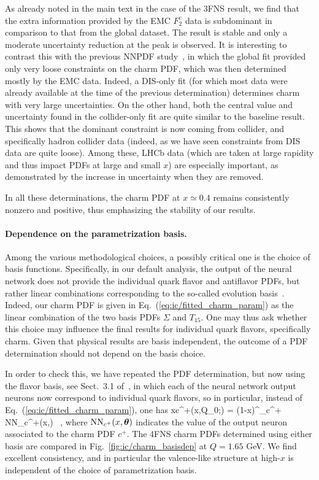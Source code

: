 As already noted in the main  text in the case of the 3FNS
result, we find that the extra information provided by the  EMC
$F_2^c$ data is subdominant in comparison to that from the global
dataset. The result is stable and only a moderate
uncertainty reduction at the peak is observed. It is interesting to
contrast this with the previous NNPDF study~\cite{Ball:2016neh}, in
which the global fit provided only very loose constraints on the charm
PDF, which was then determined mostly by the EMC data.
%
Indeed, a DIS-only fit (for which most data were already available at the time
of the previous determination) determines charm with very large
uncertainties. On the other hand, both the central value and
uncertainty found in the collider-only fit are quite similar to the
baseline result.
%
This shows that the dominant constraint is now coming from
collider, and specifically hadron collider data (indeed, as we have
seen constraints from DIS data are quite loose). Among these, LHCb
data (which are taken at large rapidity and thus impact PDFs at large
and small $x$) are especially important, as demonstrated by the
increase in uncertainty when they are removed.

In all these determinations, the charm
PDF at $x\simeq 0.4$ remains consistently nonzero and positive, thus
emphasizing the stability of our results.

\paragraph{Dependence on the parametrization basis.}
%
Among the various methodological choices, a possibly critical one is
the choice of basis functions. Specifically, in our default analysis,
the output of the neural network does not provide the individual
quark flavor and antiflavor PDFs, but rather linear combinations
corresponding to the so-called evolution
basis~\cite{Ball:2021leu}. Indeed, our charm PDF is given in
Eq.~(\ref{eq:ic/fitted_charm_param})  as the linear combination of the
two basis PDFs $\Sigma$ and $T_{15}$.
One may thus ask whether this choice may influence the final results
for individual quark flavors, specifically charm.
Given that physical results are basis
independent, the outcome of a PDF determination should not depend
on the basis choice.

In order to check this, we have repeated the PDF determination, but
now using the flavor basis, see Sect.~3.1 of~\cite{Ball:2021leu}, in which
each of the  neural network output neurons now correspond to individual quark
flavors, so in particular,
instead of Eq.~(\ref{eq:ic/fitted_charm_param}),  one has
\be
\label{eq:ic/fitted_charm_param_flavour}
xc^+(x,Q_0;{\boldsymbol \theta}) =
 (1-x)^{\beta_{c^+}} {\rm NN}_{c^+}(x,{\boldsymbol \theta}) \, ,
\ee
where ${\rm NN}_{c^+}(x,{\boldsymbol \theta})$
indicates the value of the output neuron associated to the charm PDF $c^+$.
%
The 4FNS charm PDFs determined using either basis are compared 
in Fig.~\ref{fig:ic/charm_basisdep}  at $Q=1.65$ GeV.
%
We find excellent consistency, and in particular 
the valence-like structure at high-$x$ is independent of the choice
of parametrization basis.

